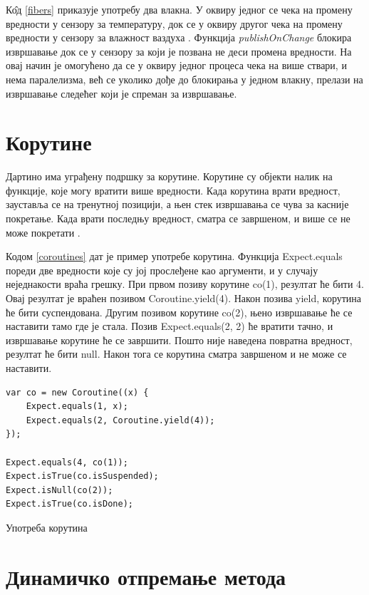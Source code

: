 \documentclass[12pt,oneside]{memoir}
\begin{document}
К\^{о}д \ref{fibers} приказује употребу два влакна. У оквиру једног се чека на промену вредности у сензору за температуру, док се у оквиру другог чека на промену вредности у сензору за влажност ваздуха \cite{Dartino}. Функција \textit{publishOnChange} блокира извршавање док се у сензору за који је позвана не деси промена вредности. На овај начин је омогућено да се у оквиру једног процеса чека на више ствари, и нема паралелизма, већ се уколико дође до блокирања у једном влакну, прелази на извршавање следећег који је спреман за извршавање.

\section{Корутине}
\label{korutine}

Дартино има уграђену подршку за корутине. Корутине су објекти налик на функције, које могу вратити више вредности. Када корутина врати вредност, зауставља се на тренутној позицији, а њен стек извршавања се чува за касније покретање. Када врати последњу вредност, сматра се завршеном, и више се не може покретати  \cite{korutine_i_vlakna}.

Кодом \ref{coroutines} дат је пример употребе корутина. Функција Expect.equals пореди две вредности које су јој прослеђене као аргументи, и у случају неједнакости враћа грешку. При првом позиву корутине co(1), резултат ће бити 4. Овај резултат је враћен позивом Coroutine.yield(4). Након позива yield, корутина ће бити суспендована. Другим позивом корутине co(2), њено извршавање ће се наставити тамо где је стала. Позив Expect.equals(2, 2) ће вратити тачно, и извршавање корутине ће се завршити. Пошто није наведена повратна вредност, резултат ће бити null. Након тога се корутина сматра завршеном и не може се наставити.

\begin{listing}
\begin{verbatim}
var co = new Coroutine((x) {
    Expect.equals(1, x);
    Expect.equals(2, Coroutine.yield(4));
});

Expect.equals(4, co(1));
Expect.isTrue(co.isSuspended);
Expect.isNull(co(2));
Expect.isTrue(co.isDone);
\end{verbatim}
\caption{Употреба корутина}
\label{coroutines}
\end{listing}

\section{Динамичко отпремање метода}
\label{sec:otpremanje}
\end{document}
